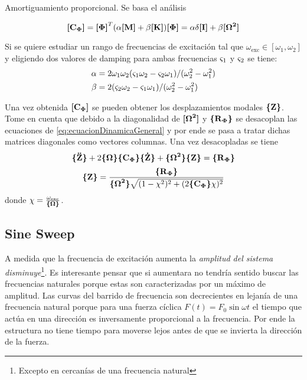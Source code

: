 Amortiguamiento proporcional. Se basa el análisis 

\begin{equation}
	\Mme{C\modal} = \Mme{\Phib}^T ( \alpha \Mme{M}+\beta \Mme{K})\Mme{\Phib} = \alpha \delta \Mme{I} +\beta \Mme{\Omegab^2}
\end{equation}

Si se quiere estudiar un rango de frecuencias de excitación tal que $\omega_{\mathrm{exc}}\in [\omega_1, \omega_2]$ y eligiendo dos valores de damping para ambas frecuencias $\dampfact_1$ y $\dampfact_2$ se tiene:
\begin{align*}
\alpha &= 2\omega_1 \omega_2 (\dampfact_1 \omega_2 -\dampfact_2 \omega_1)/(\omega_2^2 - \omega_1^2) \\ \beta &= 2(\dampfact_2\omega_2 -\dampfact_1 \omega_1)/(\omega_2^2 - \omega_1^2)
\end{align*}

Una vez obtenida $\Mme{C\modal}$ se pueden obtener los desplazamientos modales $\Cme{Z}$. Tome en cuenta que debido a la diagonalidad de $\Mme{\Omegab^2}$ y $\Cme{R\modal }$ se desacoplan las ecuaciones de \ref{eq:ecuacionDinamicaGeneral} y por ende se pasa a tratar dichas matrices diagonales como vectores columnas. Una vez desacopladas se tiene
 \[\Cme{\boldsymbol{\ddot{\mathrm{Z}}}}+2\COmega \Cme{C\modal} \Cme{\boldsymbol{\dot{\mathrm{Z}}}} + \Cme{\Omegab^2} \Cme{Z} = \Cme{R\modal} \]
\[
\Cme{Z} = \frac{\Cme{R\modal }}{ \Cme{\Omegab^2} \sqrt{(1-\chi^2)^2 + (2 \Cme{C\modal} \chi)^2}}
\]
donde $\chi = \frac{\omega_{\mathrm{exc}}}{\COmega}$. 



\subsection*{Sine Sweep}
A medida que la frecuencia de excitación aumenta la \textit{amplitud del sistema disminuye}\footnote{Excepto en cercanías de una frecuencia natural}. Es interesante pensar que si aumentara no tendría sentido buscar las frecuencias naturales porque estas son caracterizadas por un máximo de amplitud. Las curvas del barrido de frecuencia son decrecientes en lejanía de una frecuencia natural porque para una fuerza cíclica $F(t)=F_0\sin \omega t$ el tiempo que actúa en una dirección es inversamente proporcional a la frecuencia. Por ende la estructura no tiene tiempo para moverse lejos antes de que se invierta la dirección de la fuerza.


